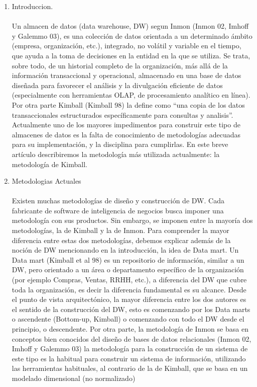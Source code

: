 \documentclass[preprint,12pt]{elsarticle}
\begin{document}
\begin{enumerate}[3.1]
    \item Introduccion. \\
\\
Un almacen de datos (data warehouse, DW) segun Inmon (Inmon 02, Imhoff y Galemmo 03), es una colecci\'on de datos orientada a un determinado \'ambito (empresa, organización, etc.), integrado, no volátil y variable en el tiempo, que ayuda a la toma de decisiones en la entidad en la que se utiliza. Se trata, sobre todo, de un historial completo de la organización, más allá de la información transaccional y operacional, almacenado en una base de datos diseñada para favorecer el análisis y la divulgación eficiente de datos (especialmente con herramientas OLAP, de procesamiento analítico en línea). Por otra parte Kimball (Kimball 98) la define como “una copia de los datos transaccionales estructurados específicamente para consultas y analisis”. Actualmente uno de los mayores impedimentos para construir este tipo de almacenes de datos es la falta de conocimiento de metodologías adecuadas para su implementación, y la disciplina para cumplirlas. En este breve art\'iculo describiremos la metodología más utilizada actualmente: la metodología de Kimball.

    \item Metodologias Actuales \\
\\
 Existen muchas metodologías de diseño y construcción de DW. Cada fabricante de software de inteligencia de negocios busca imponer una metodología con sus productos. Sin embargo, se imponen entre la mayoría dos metodologías, la de Kimball y la de Inmon. Para comprender la mayor diferencia entre estas dos metodologías, debemos explicar además de la noción de DW mencionando en la introducción, la idea de Data mart. Un Data mart (Kimball et al 98) es un repositorio de información, similar a un DW, pero orientado a un área o departamento específico de la  organización (por ejemplo Compras, Ventas, RRHH, etc.), a diferencia del DW que cubre toda la organización, es decir la diferencia fundamental es su alcance.
Desde el punto de vista arquitectónico, la mayor diferencia entre los dos autores es el sentido de la construcción del DW, esto es comenzando por los Data marts o ascendente (Bottom-up, Kimball) o comenzando con todo el DW desde el principio, o descendente.
Por otra parte, la metodología de Inmon se basa en conceptos bien conocidos del diseño de bases de datos relacionales (Inmon 02, Imhoff y Galemmo 03) la metodología para la construcción de un sistema de este tipo es la habitual para construir un sistema de información, utilizando las herramientas habituales, al contrario de la de Kimball, que se basa en un modelado dimensional (no normalizado)



\end{enumerate}
\end{document}
